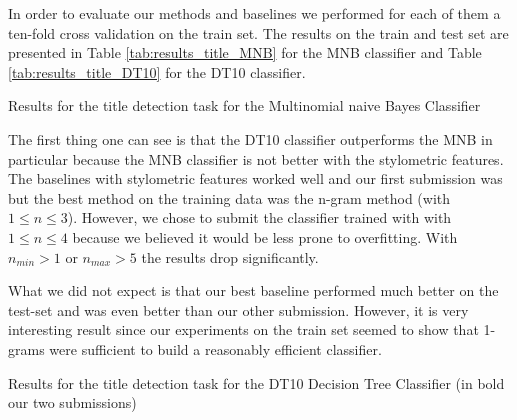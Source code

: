  In order to evaluate our methods and baselines we performed for each of them a ten-fold cross validation on the train set.
The results on the train and test set are presented in Table \ref{tab:results_title_MNB} for the MNB classifier and Table \ref{tab:results_title_DT10} for the DT10 classifier. %
\begin{table}

\caption{Results for the title detection task  for the Multinomial naive Bayes Classifier \label{tab:results_title_MNB}}
\end{table}
 The first thing one can see is that the DT10 classifier outperforms the MNB in particular because the MNB classifier is not better with the stylometric features.
The baselines with stylometric features worked well and our first submission was but the best method on the training data was the n-gram method (with $1\leq n \leq 3$). However, we chose to submit the classifier trained with with $1\leq n \leq 4$ because we believed it would be less prone to overfitting.
With $n_{min}>1$ or $n_{max}>5$ the results drop significantly.
 

  What we did not expect is that our best baseline performed much better on the test-set and was even better than our other submission. However, it is very interesting result since our experiments on the train set seemed to show that 1-grams were sufficient to build a reasonably efficient classifier.


\begin{table}

\caption{Results for the title detection task for the DT10 Decision Tree Classifier (in bold our two submissions) \label{tab:results_title_DT10}}
\end{table}
